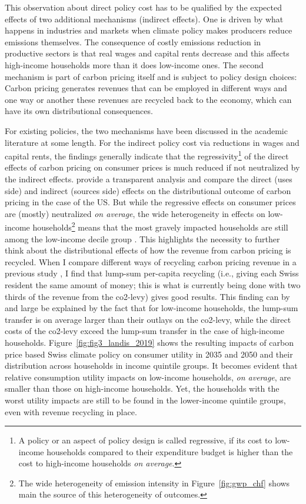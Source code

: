 \documentclass[a4paper,11pt,abstract=true]{scrartcl}
\begin{document}
This observation about direct policy cost has to be qualified by the expected effects of two additional mechanisms (indirect effects).
One is driven by what happens in industries and markets when climate policy makes producers reduce emissions themselves.
The consequence of costly emissions reduction in productive sectors is that real wages and capital rents decrease and this affects high-income households more than it does low-income ones.
The second mechanism is part of carbon pricing itself and is subject to policy design choices:
Carbon pricing generates revenues that can be employed in different ways and one way or another these revenues are recycled back to the economy, which can have its own distributional consequences.

For existing policies, the two mechanisms have been discussed in the academic literature at some length.
For the indirect policy cost via reductions in wages and capital rents, the findings generally indicate that the regressivity\footnote{%
  A policy or an aspect of policy design is called regressive, if its cost to low-income households compared to their expenditure budget is higher than the cost to high-income households \emph{on average}.
}
of the direct effects of carbon pricing on consumer prices is much reduced if not neutralized by the indirect effects.
\citet{rausch_distributional_2011} provide a transparent analysis and compare the direct (uses side) and indirect (sources side) effects on the distributional outcome of carbon pricing in the case of the US.
But while the regressive effects on consumer prices are (mostly) neutralized \emph{on average}, the wide heterogeneity in effects on low-income households\footnote{%
  The wide heterogeneity of emission intensity in Figure~\ref{fig:gwp_chf} shows main the source of this heterogeneity of outcomes.}
means that the most gravely impacted households are still among the low-income decile group \citep{landis_cost_2019, landis_efficient_2019}.
This highlights the necessity to further think about the distributional effects of how the revenue from carbon pricing is recycled.
When I compare different ways of recycling carbon pricing revenue in a previous study \citep{landis_cost_2019}, I find that lump-sum per-capita recycling (i.e., giving each Swiss resident the same amount of money; this is what is currently being done with two thirds of the revenue from the \ac{co2}-levy) gives good results.
This finding can by and large be explained by the fact that for low-income households, the lump-sum transfer is on average larger than their outlays on the \ac{co2}-levy, while the direct costs of the \ac{co2}-levy exceed the lump-sum transfer in the case of high-income households.
Figure~\ref{fig:fig3_landis_2019} shows the resulting impacts of carbon price based Swiss climate policy on consumer utility in 2035 and 2050 and their distribution across households in income quintile groups.
It becomes evident that relative consumption utility impacts on low-income households, \emph{on average}, are smaller than those on high-income households.
Yet, the households with the worst utility impacts are {still} to be found in the lower-income quintile groups, even with revenue recycling in place.
\end{document}
